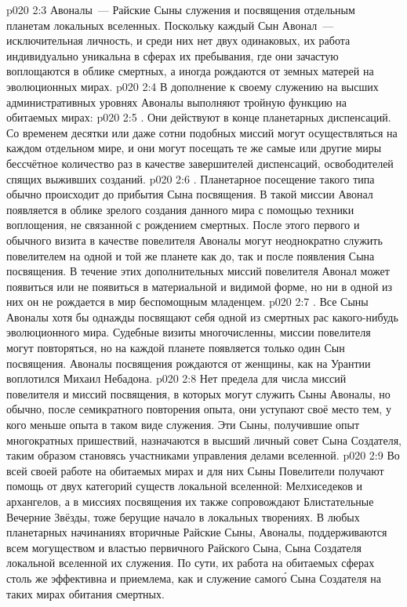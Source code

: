 \vs p020 2:3 Авоналы~--- Райские Сыны служения и посвящения отдельным планетам локальных вселенных. Поскольку каждый Сын Авонал~--- исключительная личность, и среди них нет двух одинаковых, их работа индивидуально уникальна в сферах их пребывания, где они зачастую воплощаются в облике смертных, а иногда рождаются от земных матерей на эволюционных мирах.
\vs p020 2:4 \pc В дополнение к своему служению на высших административных уровнях Авоналы выполняют тройную функцию на обитаемых мирах:
\vs p020 2:5 . Они действуют в конце планетарных диспенсаций. Со временем десятки или даже сотни подобных миссий могут осуществляться на каждом отдельном мире, и они могут посещать те же самые или другие миры бессчётное количество раз в качестве завершителей диспенсаций, освободителей спящих выживших созданий.
\vs p020 2:6 . Планетарное посещение такого типа обычно происходит до прибытия Сына посвящения. В такой миссии Авонал появляется в облике зрелого создания данного мира с помощью техники воплощения, не связанной с рождением смертных. После этого первого и обычного визита в качестве повелителя Авоналы могут неоднократно служить повелителем на одной и той же планете как до, так и после появления Сына посвящения. В течение этих дополнительных миссий повелителя Авонал может появиться или не появиться в материальной и видимой форме, но ни в одной из них он не рождается в мир беспомощным младенцем.
\vs p020 2:7 . Все Сыны Авоналы хотя бы однажды посвящают себя одной из смертных рас какого\hyp{}нибудь эволюционного мира. Судебные визиты многочисленны, миссии повелителя могут повторяться, но на каждой планете появляется только один Сын посвящения. Авоналы посвящения рождаются от женщины, как на Урантии воплотился Михаил Небадона.
\vs p020 2:8 \pc Нет предела для числа миссий повелителя и миссий посвящения, в которых могут служить Сыны Авоналы, но обычно, после семикратного повторения опыта, они уступают своё место тем, у кого меньше опыта в таком виде служения. Эти Сыны, получившие опыт многократных пришествий, назначаются в высший личный совет Сына Создателя, таким образом становясь участниками управления делами вселенной.
\vs p020 2:9 Во всей своей работе на обитаемых мирах и для них Сыны Повелители получают помощь от двух категорий существ локальной вселенной: Мелхиседеков и архангелов, а в миссиях посвящения их также сопровождают Блистательные Вечерние Звёзды, тоже берущие начало в локальных творениях. В любых планетарных начинаниях вторичные Райские Сыны, Авоналы, поддерживаются всем могуществом и властью первичного Райского Сына, Сына Создателя локальной вселенной их служения. По сути, их работа на обитаемых сферах столь же эффективна и приемлема, как и служение самог\'о Сына Создателя на таких мирах обитания смертных.
